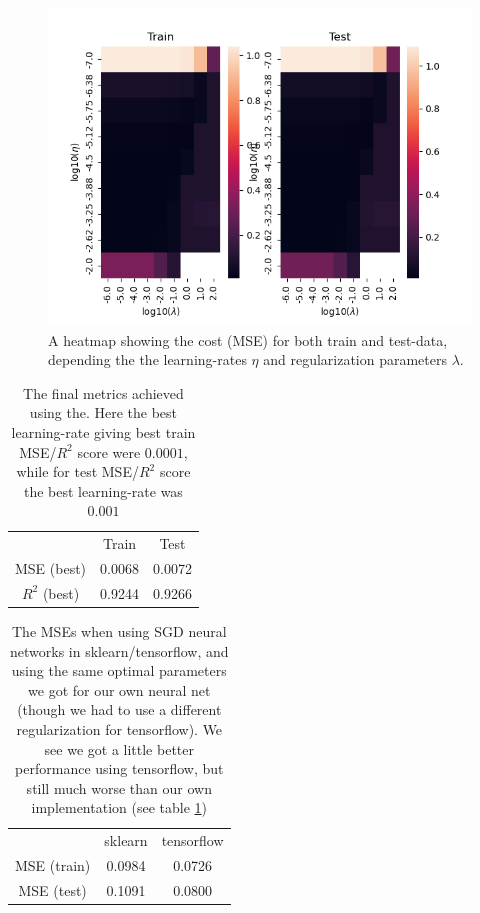 \documentclass{article}
\begin{document}
\begin{figure}
      \centering
      \includegraphics[scale=0.8]{heatmap_frankefunction}
      \caption{A heatmap showing the cost (MSE) for both train and test-data,
            depending the the learning-rates $\eta$ and regularization parameters
            $\lambda$.}
      \label{heatmapplot-franke}
\end{figure}

\begin{table}
      \centering
      \begin{tabular}{| c | c | c |}
                         & Train  & Test   \\
            MSE (best)   & 0.0068 & 0.0072 \\
            $R^2$ (best) & 0.9244 & 0.9266
      \end{tabular}
      \caption{The final metrics achieved using the. Here the best learning-rate
            giving best train MSE/$R^2$ score were $0.0001$, while for test MSE/$R^2$
            score the best learning-rate was $0.001$}
      \label{metrics-nn-franke}
\end{table}

\begin{table}
      \centering
      \begin{tabular}{| c | c | c |}
                        & sklearn & tensorflow \\
            MSE (train) & 0.0984  & 0.0726     \\
            MSE (test)  & 0.1091  & 0.0800
      \end{tabular}
      \caption{The MSEs when using SGD neural networks in sklearn/tensorflow,
            and using the same optimal parameters we got for our own neural net
            (though we had to use a different regularization for tensorflow). We see
            we got a little better performance using tensorflow, but still much worse
            than our own implementation (see table \ref{metrics-nn-franke})}
      \label{metrics-nn-franke-sklearn-tf}
\end{table}
\end{document}
